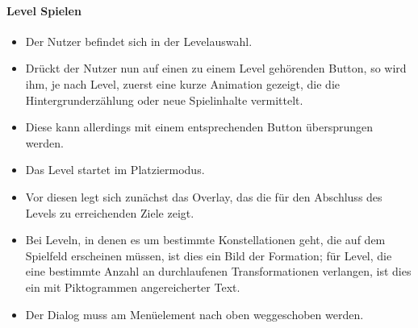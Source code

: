 \paragraph{Level Spielen}
\begin{itemize}
\item Der Nutzer befindet sich in der Levelauswahl.
\item Drückt der Nutzer nun auf einen zu einem
Level gehörenden Button, so wird ihm, je nach Level, zuerst eine kurze
Animation gezeigt, die die Hintergrunderzählung oder neue Spielinhalte vermittelt. 
\item Diese kann allerdings mit einem entsprechenden Button übersprungen werden.
\item Das Level startet im Platziermodus.
\item Vor diesen legt sich zunächst das Overlay, das die für den Abschluss des Levels zu erreichenden Ziele
zeigt.
\item Bei Leveln, in denen es um bestimmte Konstellationen geht, die auf
dem Spielfeld erscheinen müssen, ist dies ein Bild der Formation; für Level, die eine bestimmte Anzahl an durchlaufenen Transformationen
verlangen, ist dies ein mit Piktogrammen angereicherter Text.
\item Der Dialog muss am Menüelement nach oben weggeschoben werden. 
\end{itemize}


